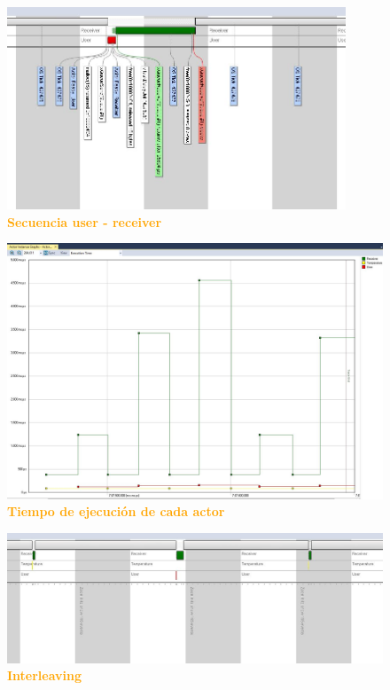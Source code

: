 \documentclass{article}
\begin{document}
\begin{figure}[H]
   \centering
   \includegraphics[width=0.9\textwidth]{figures/trace14.jpg}
   \centering
   \caption{\textbf{\textcolor{Orange}{Secuencia user - receiver}}}
\end{figure}
\begin{figure}[H]
   \centering
   \includegraphics[width=1.0\textwidth]{figures/trace12.jpg}
   \centering
   \caption{\textbf{\textcolor{Orange}{Tiempo de ejecución de cada actor}}}
\end{figure}



\begin{figure}[H]
   \centering
   \includegraphics[width=1.0\textwidth]{figures/trace15.jpg}
   \centering
   \caption{\textbf{\textcolor{Orange}{Interleaving}}}
\end{figure}
\end{document}

